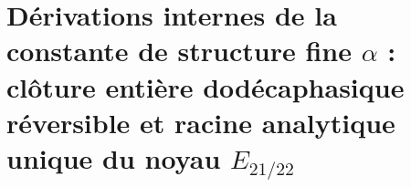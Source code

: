 \chapter{Dérivations internes de la constante de structure fine \(\alpha\) : clôture entière dodécaphasique réversible et racine analytique unique du noyau \(E_{21/22}\)}
\label{chap:p3-final:31:dos_derivaciones_alpha}



